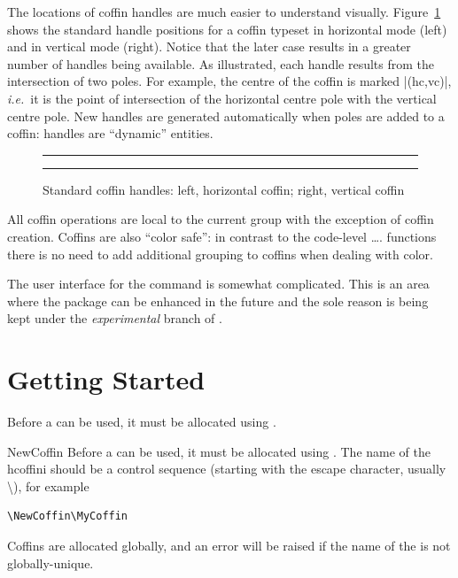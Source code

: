  The locations of coffin handles are much easier to understand
 visually. Figure~\ref{fgr:handles} shows the standard handle
 positions for a coffin typeset in horizontal mode (left) and in
 vertical mode (right). Notice that the later case results in a greater
 number of handles being available. As illustrated, each handle
 results from the intersection of two poles. For example, the centre
 of the coffin is marked |(hc,vc)|, \emph{i.e.}~it is the
 point of intersection of the horizontal centre pole with the
 vertical centre pole. New handles are generated automatically when
 poles are added to a coffin: handles are \enquote{dynamic} entities.
 
 \NewCoffin \ExampleCoffin
\begin{figure}[htbp]
   \hfil
     \colorbox{black}{\color{white}\begin{minipage}{0.4\textwidth}
     \SetHorizontalCoffin\ExampleCoffin
       {\color{white}\rule{1 in}{1 in}}
  \DisplayCoffinHandles{}
   \end{minipage}}
   \hfil
   \begin{minipage}{0.4\textwidth}
     \SetVerticalCoffin\ExampleCoffin{1 in}
       {\color{black!10!white}\rule{1 in}{1 in}}
     \DisplayCoffinHandles{}
   \end{minipage}
   \hfil
   \caption{Standard coffin handles: left, horizontal coffin; right,
     vertical coffin}
   \label{fgr:handles}
 \end{figure}


All coffin operations are local to the current \tex group with the exception
of coffin creation. Coffins are also “color safe”: in contrast to the code-level \ldots.
functions there is no need to add additional grouping to coffins when dealing with color.

The user interface for the command is somewhat complicated. This is an area where the package
can be enhanced in the future and the sole reason is being kept under the \emph{experimental}
branch of .

\section{Getting Started}

Before a  can be used, it must be allocated using .

\begin{docCommand}{NewCoffin}{}
Before a  can be used, it must be allocated using . The name of the
hcoffini should be a control sequence (starting with the escape character, usually \textbackslash ), for
example

\begin{verbatim}
\NewCoffin\MyCoffin
\end{verbatim}

Coffins are allocated globally, and an error will be raised if the name of the  is
not globally-unique.
\end{docCommand}

